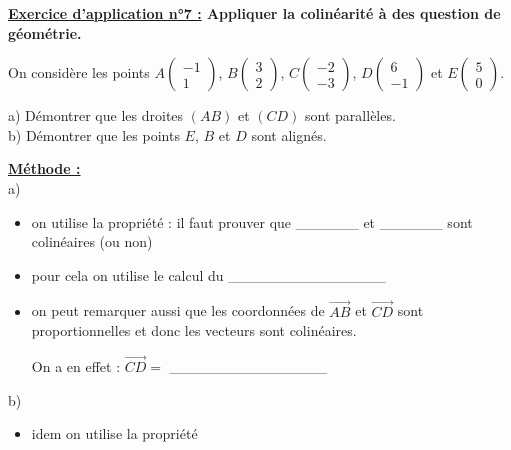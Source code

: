 \documentclass[12pt]{article}
\newcommand*{\Coord}[2]{%
  \ensuremath{
    \begin{pmatrix} 
      #1\\ 
      #2 
    \end{pmatrix}}}
\begin{document}
\begin{mdframed}[
    linewidth=1pt,
    roundcorner=5pt,
    linecolor=RoyalBlue,
    innertopmargin=10pt,
    innerbottommargin=10pt
]
{\color{RoyalBlue}\textbf{\underline{Exercice d'application n°7 :} 
Appliquer la colinéarité à des question de géométrie.}}
\vspace{10pt}

On considère les points $A\Coord{-1}{1}$, $B\Coord{3}{2}$, $C\Coord{-2}{-3}$, 
$D\Coord{6}{-1}$ et $E\Coord{5}{0}$.

\vspace{5pt}
a) Démontrer que les droites $(AB)$ et $(CD)$ sont parallèles.
\\b) Démontrer que les points $E$, $B$ et $D$ sont alignés.

\begin{mdframed}[
    linewidth=1pt,
    roundcorner=5pt,
    linecolor=black,
    innertopmargin=10pt,
    innerbottommargin=10pt,
    backgroundcolor=gray!15
]
\underline{\textbf{Méthode :}}
\vspace{5pt}
\\a) 
\begin{itemize}
    \item on utilise la propriété : il faut prouver que \_\_\_\_\_\_ et \_\_\_\_\_\_ 
    sont colinéaires (ou non)

    \vspace{10pt}
    \item pour cela on utilise le calcul du \_\_\_\_\_\_\_\_\_\_\_\_\_\_\_
    
    \vspace{10pt}
    \item on peut remarquer aussi que les coordonnées de $\overrightarrow{AB}$ et $\overrightarrow{CD}$ 
    sont proportionnelles et donc les vecteurs sont colinéaires.
    
    \vspace{10pt}
    On a en effet : $\overrightarrow{CD} =$ \_\_\_\_\_\_\_\_\_\_\_\_\_\_\_
\end{itemize}

\vspace{5pt}
b) 
\begin{itemize}
    \item idem on utilise la propriété
\end{itemize}
\end{mdframed}

\end{mdframed}


\vspace{10pt}
\end{document}
